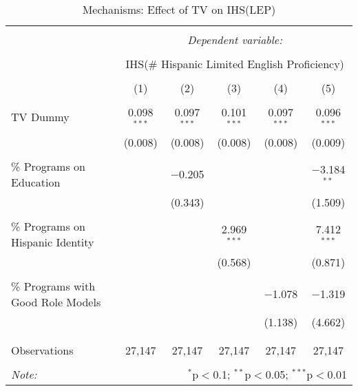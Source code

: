
\begin{table}[!htbp] \centering 
  \caption{Mechanisms: Effect of TV on IHS(LEP)} 
  \label{} 
\begin{tabular}{@{\extracolsep{-2pt}}lccccc} 
\\[-1.8ex]\hline 
\hline \\[-1.8ex] 
 & \multicolumn{5}{c}{\textit{Dependent variable:}} \\ 
\cline{2-6} 
\\[-1.8ex] & \multicolumn{5}{c}{IHS(\# Hispanic Limited English Proficiency)} \\ 
\\[-1.8ex] & (1) & (2) & (3) & (4) & (5)\\ 
\hline \\[-1.8ex] 
 TV Dummy & 0.098$^{***}$ & 0.097$^{***}$ & 0.101$^{***}$ & 0.097$^{***}$ & 0.096$^{***}$ \\ 
  & (0.008) & (0.008) & (0.008) & (0.008) & (0.009) \\ 
  & & & & & \\ 
 \% Programs on Education &  & $-$0.205 &  &  & $-$3.184$^{**}$ \\ 
  &  & (0.343) &  &  & (1.509) \\ 
  & & & & & \\ 
 \% Programs on Hispanic Identity &  &  & 2.969$^{***}$ &  & 7.412$^{***}$ \\ 
  &  &  & (0.568) &  & (0.871) \\ 
  & & & & & \\ 
 \% Programs with Good Role Models &  &  &  & $-$1.078 & $-$1.319 \\ 
  &  &  &  & (1.138) & (4.662) \\ 
  & & & & & \\ 
\hline \\[-1.8ex] 
Observations & 27,147 & 27,147 & 27,147 & 27,147 & 27,147 \\ 
\hline 
\hline \\[-1.8ex] 
\textit{Note:}  & \multicolumn{5}{r}{$^{*}$p$<$0.1; $^{**}$p$<$0.05; $^{***}$p$<$0.01} \\ 
\end{tabular} 
\end{table} 
